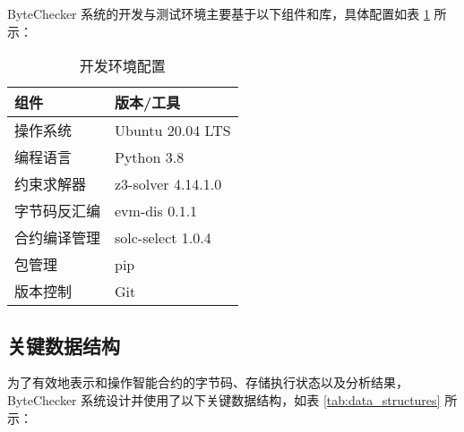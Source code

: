 \documentclass[print, master, vlined, timesmath]{DissertUESTC}
\begin{document}
ByteChecker 系统的开发与测试环境主要基于以下组件和库，具体配置如表 \ref{tab:dev_environment} 所示：

\begin{table}[H] %
    \centering
    \caption{开发环境配置}
    \label{tab:dev_environment}
    \begin{tabular}{ll}
        \toprule
        \textbf{组件} & \textbf{版本/工具} \\
        \midrule
        操作系统 & Ubuntu 20.04 LTS \\
        编程语言 & Python 3.8 \\
        约束求解器 & z3-solver 4.14.1.0 \\
        字节码反汇编 & evm-dis 0.1.1 \\
        合约编译管理 & solc-select 1.0.4 \\
        包管理 & pip \\
        版本控制 & Git \\
        \bottomrule
    \end{tabular}
\end{table}



\subsection{关键数据结构}

为了有效地表示和操作智能合约的字节码、存储执行状态以及分析结果，ByteChecker 系统设计并使用了以下关键数据结构，如表 \ref{tab:data_structures} 所示：
\end{document}
